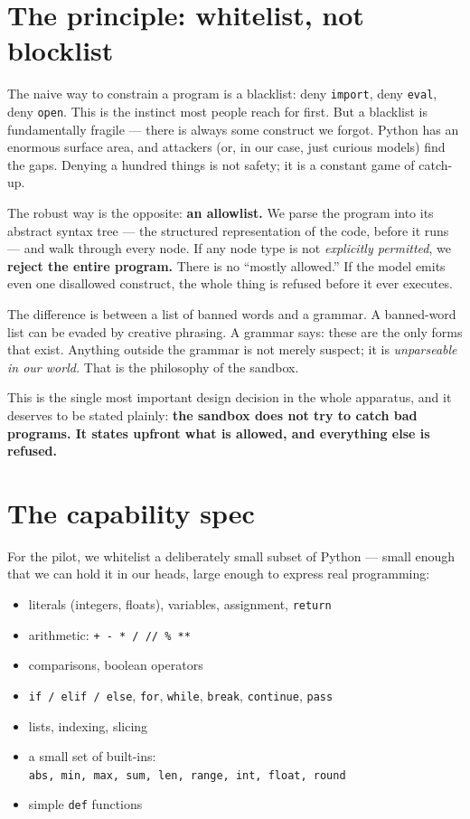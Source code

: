 \section{The principle: whitelist, not
blocklist}\label{the-principle-whitelist-not-blocklist}

The naive way to constrain a program is a blacklist: deny
\texttt{import}, deny \texttt{eval}, deny \texttt{open}. This is the
instinct most people reach for first. But a blacklist is fundamentally
fragile --- there is always some construct we forgot. Python has an
enormous surface area, and attackers (or, in our case, just curious
models) find the gaps. Denying a hundred things is not safety; it is a
constant game of catch-up.

The robust way is the opposite: \textbf{an allowlist.} We parse the
program into its abstract syntax tree --- the structured representation
of the code, before it runs --- and walk through every node. If any node
type is not \emph{explicitly permitted}, we \textbf{reject the entire
program.} There is no ``mostly allowed.'' If the model emits even one
disallowed construct, the whole thing is refused before it ever
executes.

The difference is between a list of banned words and a grammar. A
banned-word list can be evaded by creative phrasing. A grammar says:
these are the only forms that exist. Anything outside the grammar is not
merely suspect; it is \emph{unparseable in our world.} That is the
philosophy of the sandbox.

This is the single most important design decision in the whole
apparatus, and it deserves to be stated plainly: \textbf{the sandbox
does not try to catch bad programs. It states upfront what is allowed,
and everything else is refused.}

\section{The capability spec}\label{the-capability-spec}

For the pilot, we whitelist a deliberately small subset of Python ---
small enough that we can hold it in our heads, large enough to express
real programming:

\begin{itemize}
\tightlist
\item
  literals (integers, floats), variables, assignment, \texttt{return}
\item
  arithmetic: \texttt{+\ -\ *\ /\ //\ \%\ **}
\item
  comparisons, boolean operators
\item
  \texttt{if\ /\ elif\ /\ else}, \texttt{for}, \texttt{while},
  \texttt{break}, \texttt{continue}, \texttt{pass}
\item
  lists, indexing, slicing
\item
  a small set of built-ins:
  \texttt{abs,\ min,\ max,\ sum,\ len,\ range,\ int,\ float,\ round}
\item
  simple \texttt{def} functions
\end{itemize}


